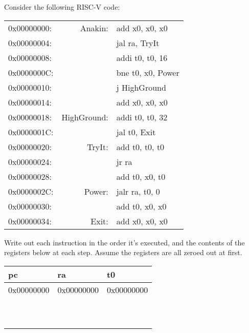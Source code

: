 \begin{blocksection}
\question Consider the following RISC-V code:

\begin{tabular}{l r l}
0x00000000:		&Anakin:	&add x0, x0, x0 \\
0x00000004:		&			&jal ra, TryIt \\
0x00000008:		&			&addi t0, t0, 16 \\
0x0000000C:		&			&bne t0, x0, Power \\
0x00000010:		&			&j HighGround \\
0x00000014:		&			&add x0, x0, x0 \\
0x00000018:		&HighGround:	&addi t0, t0, 32 \\
0x0000001C:		&			&jal t0, Exit \\
0x00000020:		&TryIt:		&add t0, t0, t0 \\
0x00000024:		&			&jr ra \\
0x00000028:		&			&add t0, x0, t0 \\
0x0000002C:		&Power:		&jalr ra, t0, 0 \\
0x00000030:		&			&add t0, x0, x0 \\
0x00000034:		&Exit:		&add x0, x0, x0 \\
\end{tabular}

Write out each instruction in the order it's executed, and the contents of the registers below at each step. Assume the registers are all zeroed out at first.

\begin{tabular}{ |l|l|l| } 
 \hline
 pc & ra & t0 \\ 
 \hline
 0x00000000 & 0x00000000 & 0x00000000 \\
 \hline
 & & \\
 \hline 
 & & \\
 \hline
 & & \\
 \hline 
 & & \\
 \hline
 & & \\
 \hline
 & & \\
 \hline
 & & \\
 \hline
 & & \\
 \hline
 & & \\
 \hline
 & & \\
 \hline
\end{tabular}


\end{blocksection}
